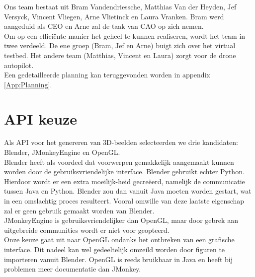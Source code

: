 \documentclass{peno-opdracht1}
\begin{document}
\maketitle

\noindent
	Ons team bestaat uit Bram Vandendriessche, Matthias Van der Heyden, Jef Versyck, Vincent Vliegen, Arne Vlietinck en Laura Vranken. Bram werd aangeduid als CEO en Arne zal de taak van CAO op zich nemen. \\
	Om op een effici\"ente manier het geheel te kunnen realiseren, wordt het team in twee verdeeld. De ene groep (Bram, Jef en Arne) buigt zich over het virtual testbed. Het andere team  (Matthias, Vincent en Laura) zorgt voor de drone autopilot.\\
	Een gedetailleerde planning kan teruggevonden worden in appendix \ref{App:Planning}.

\section{API keuze}
Als API voor het genereren van 3D-beelden selecteerden we drie kandidaten: Blender, JMonkeyEngine en OpenGL.\\
Blender heeft als voordeel dat voorwerpen gemakkelijk aangemaakt kunnen worden door de gebruiksvriendelijke interface. Blender gebruikt echter Python. Hierdoor wordt er een extra moeilijk-heid gecre\"eerd, namelijk de communicatie tussen Java en Python. Blender zou dan vanuit Java moeten worden gestart, wat in een omslachtig proces resulteert. Vooral omwille van deze laatste eigenschap zal er geen gebruik gemaakt worden van Blender. \\
JMonkeyEngine is gebruiksvriendelijker dan OpenGL, maar door gebrek aan uitgebreide communities wordt er niet voor geopteerd.\\
Onze keuze gaat uit naar OpenGL ondanks het ontbreken van een grafische interface. Dit nadeel kan wel gedeeltelijk omzeild worden door figuren te importeren vanuit Blender. OpenGL is reeds bruikbaar in Java en heeft bij problemen meer documentatie dan JMonkey.
\end{document}
